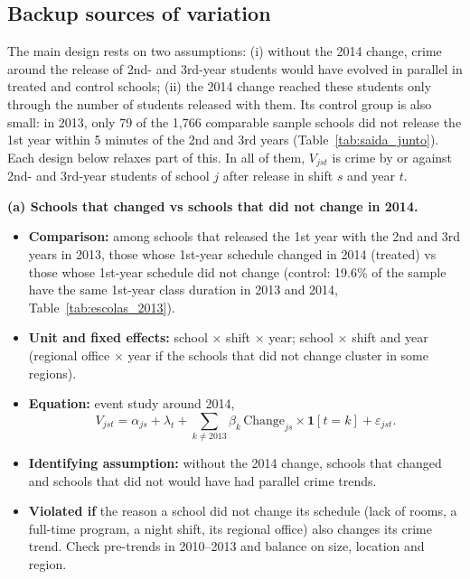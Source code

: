 \documentclass[11pt]{article}
\begin{document}
\iffalse
\subsection{Backup sources of variation}

The main design rests on two assumptions: (i) without the 2014 change, crime
around the release of 2nd- and 3rd-year students would have evolved in parallel
in treated and control schools; (ii) the 2014 change reached these students only
through the number of students released with them. Its control group is also
small: in 2013, only 79 of the 1,766 comparable sample schools did not release
the 1st year within 5 minutes of the 2nd and 3rd years
(Table~\ref{tab:saida_junto}). Each design below relaxes part of this. In all of
them, $V_{jst}$ is crime by or against 2nd- and 3rd-year students of school $j$
after release in shift $s$ and year $t$.

\medskip
\noindent\textbf{(a) Schools that changed vs schools that did not change in 2014.}
\begin{itemize}
  \item \textbf{Comparison:} among schools that released the 1st year with the
        2nd and 3rd years in 2013, those whose 1st-year schedule changed in 2014
        (treated) vs those whose 1st-year schedule did not change (control:
        19.6\% of the sample have the same 1st-year class duration in 2013 and
        2014, Table~\ref{tab:escolas_2013}).
  \item \textbf{Unit and fixed effects:} school $\times$ shift $\times$ year;
        school $\times$ shift and year (regional office $\times$ year if the
        schools that did not change cluster in some regions).
  \item \textbf{Equation:} event study around 2014,
        \begin{equation}
          V_{jst} = \alpha_{js} + \lambda_t + \sum_{k \neq 2013} \beta_k\,
          \text{Change}_{js} \times \mathbf{1}[t=k] + \varepsilon_{jst}.
        \end{equation}
  \item \textbf{Identifying assumption:} without the 2014 change, schools that
        changed and schools that did not would have had parallel crime trends.
  \item \textbf{Violated if} the reason a school did not change its schedule
        (lack of rooms, a full-time program, a night shift, its regional office)
        also changes its crime trend. Check pre-trends in 2010--2013 and balance
        on size, location and region.
\end{itemize}
\end{document}
